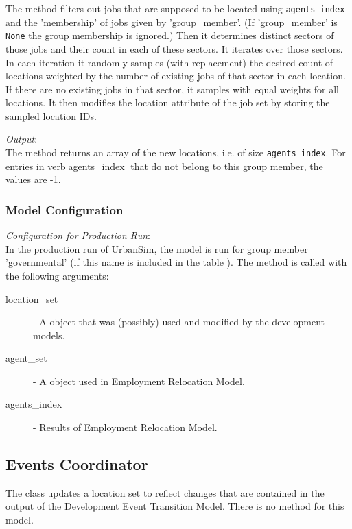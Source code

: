 The method filters out jobs that are supposed to be located using \verb|agents_index| and 
the 'membership' of jobs given by 'group_member'. (If 'group_member' is \verb|None| the group membership is ignored.)
Then it determines distinct sectors of those jobs and their count in each of
these sectors. It iterates over those sectors. In each iteration it
randomly samples (with replacement) the desired count of locations
weighted by the number of existing jobs of that sector in each
location. If there are no existing jobs in that sector, it samples
with equal weights for all locations.  It then modifies the location
attribute of the job set by storing the sampled
location IDs.

{\it Output}:~\\[1mm]
The method returns an array of the new locations, i.e. of size
\verb|agents_index|. For entries in verb|agents_index| that do not belong to this group member, the values are -1.

\subsubsection{Model Configuration}
\modelsindex
%
{\em Configuration for Production Run}:\\[1mm]
In the production run of UrbanSim, the model is run for group member 'governmental' (if this name is included
in the table ).
The  method is called with
the following arguments:
\begin{description}
\item[location_set] - A  object that was (possibly) used
  and modified by the development models. 
\item[agent_set] - A  object used in Employment Relocation
  Model. 
\item[agents_index] - Results of Employment Relocation Model. 
\end{description}

\subsection{Events Coordinator}
\label{sec:events-coordinator}
%
The class  updates a location set to reflect changes
that are contained in the output of the Development Event Transition Model. 
There is no  method for this model. 
%
